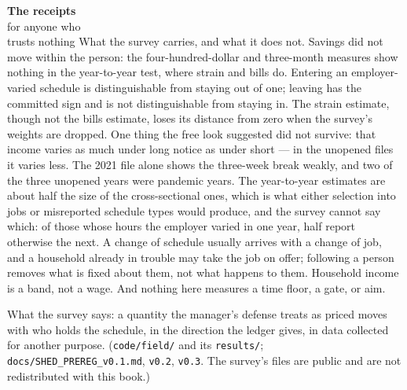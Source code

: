 \begin{receipts}{\textbf{The receipts}\\for anyone who\\trusts nothing}
What the survey carries, and what it does not. Savings did not move
within the person: the four-hundred-dollar and three-month measures
show nothing in the year-to-year test, where strain and bills do.
Entering an employer-varied schedule is distinguishable from staying
out of one; leaving has the committed sign and is not distinguishable
from staying in. The strain estimate, though not the bills estimate,
loses its distance from zero when the survey's weights are dropped.
One thing the free look suggested did not survive: that income varies
as much under long notice as under short --- in the unopened files it
varies less. The 2021 file alone shows the three-week break weakly,
and two of the three unopened years were pandemic years.
The year-to-year estimates are about half the size of the
cross-sectional ones, which is what either selection into jobs or
misreported schedule types would produce, and the survey cannot say
which: of those whose hours the employer varied in one year, half
report otherwise the next. A change of schedule usually arrives with a
change of job, and a household already in trouble may take the job on
offer; following a person removes what is fixed about them, not what
happens to them. Household income is a band, not a wage. And nothing
here measures a time floor, a gate, or aim.

What the survey says: a quantity the manager's defense treats as
priced moves with who holds the schedule, in the direction the ledger
gives, in data collected for another purpose. (\texttt{code/\allowbreak{}field/\allowbreak{}} and its
\texttt{results/\allowbreak{}}; \texttt{docs/\allowbreak{}SHED\_\allowbreak{}PREREG\_\allowbreak{}v0.\allowbreak{}1.\allowbreak{}md}, \texttt{v0.\allowbreak{}2}, \texttt{v0.\allowbreak{}3}. The
survey's files are public and are not redistributed with this book.)


\end{receipts}
